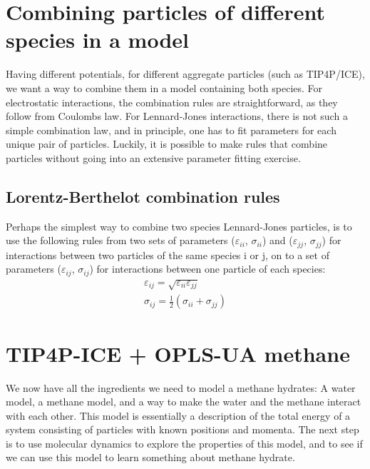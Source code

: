 \section{Combining particles of different species in a model}
Having different potentials, for different aggregate particles (such as TIP4P/ICE), we want a way to combine them in a model containing both species. For electrostatic interactions, the combination rules are straightforward, as they follow from Coulombs law. For Lennard-Jones interactions, there is not such a simple combination law, and in principle, one has to fit parameters for each unique pair of particles. Luckily, it is possible to make rules that combine particles without going into an extensive parameter fitting exercise. 

\subsection{Lorentz-Berthelot combination rules}
Perhaps the simplest way to combine two species Lennard-Jones particles, is to use the following rules from two sets of parameters ($\varepsilon_{ii}$, $\sigma_{ii}$) and ($\varepsilon_{jj}$, $\sigma_{jj}$) for interactions between two particles of the same species i or j, on to a set of parameters ($\varepsilon_{ij}$, $\sigma_{ij}$) for interactions between one particle of each species:
\begin{align}
\varepsilon_{ij} = \sqrt{\varepsilon_{ii}\varepsilon_{jj}} \\
\sigma_{ij} = \frac{1}{2} \left(\sigma_{ii}+\sigma_{jj}\right)
\end{align}

\section{TIP4P-ICE + OPLS-UA methane}
We now have all the ingredients we need to model a methane hydrates: A water model, a methane model, and a way to make the water and the methane interact with each other. This model is essentially a description of the total energy of a system consisting of particles with known positions and momenta. The next step is to use molecular dynamics to explore the properties of this model, and to see if we can use this model to learn something about methane hydrate. 

